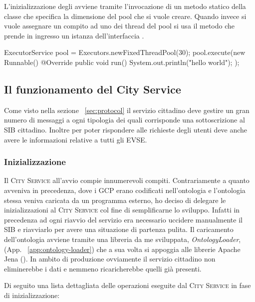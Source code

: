 L'inizializzazione degli  avviene tramite l'invocazione di un metodo statico della classe  che specifica la dimensione del pool che si vuole creare. Quando invece si vuole assegnare un compito ad uno dei thread del pool si usa il metodo  che prende in ingresso un istanza dell'interfaccia .

\begin{java}[caption={Creazione Pool di Thread},label={lst:threadPool}]
ExecutorService pool = Executors.newFixedThreadPool(30);
pool.execute(new Runnable() {
	@Override
	public void run() {
		System.out.println("hello world");
	}
});
\end{java}

\subsection{Il funzionamento del City Service}
 
Come visto nella sezione ~\ref{sec:protocol} il servizio cittadino deve gestire un gran numero di messaggi a ogni tipologia dei quali corrisponde una sottoscrizione al SIB cittadino. Inoltre per poter rispondere alle richieste degli utenti deve anche avere le informazioni relative a tutti gli EVSE.

\subsubsection{Inizializzazione}\label{subsubsec:city-init}

Il \textsc{City Service} all'avvio compie innumerevoli compiti. Contrariamente a quanto avveniva in precedenza, dove i GCP erano codificati nell'ontologia e l'ontologia stessa veniva caricata da un programma esterno, ho deciso di delegare le inizializzazioni al \textsc{City Service} col fine di semplificarne lo sviluppo. Infatti in precedenza ad ogni riavvio del servizio era necessario uccidere manualmente il SIB e riavviarlo per avere una situazione di partenza pulita. Il caricamento dell'ontologia avviene tramite una libreria da me sviluppata, \emph{OntologyLoader}, (App. ~\ref{app:ontology-loader}) che a sua volta si appoggia alle librerie Apache Jena (\cite{jena2011}). In ambito di produzione ovviamente il servizio cittadino non eliminerebbe i dati e nemmeno ricaricherebbe quelli già presenti.

Di seguito una lista dettagliata delle operazioni eseguite dal \textsc{City Service} in fase di inizializzazione:


